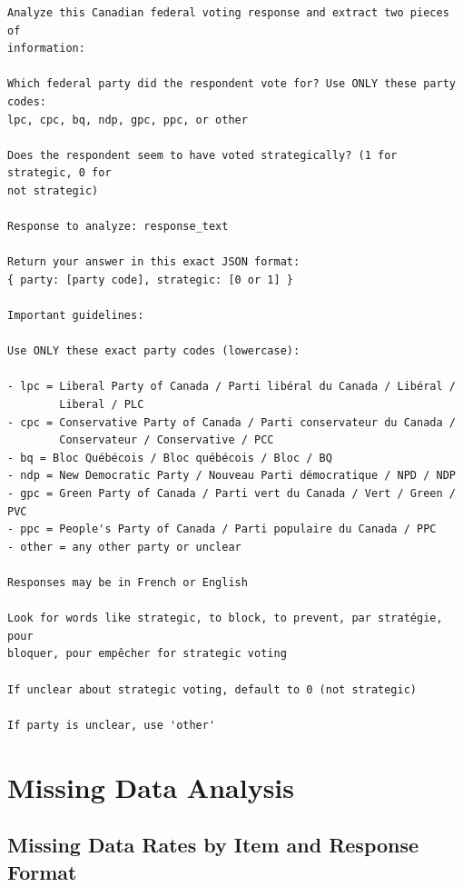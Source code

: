 {\small
\begin{verbatim}
Analyze this Canadian federal voting response and extract two pieces of 
information:

Which federal party did the respondent vote for? Use ONLY these party codes: 
lpc, cpc, bq, ndp, gpc, ppc, or other

Does the respondent seem to have voted strategically? (1 for strategic, 0 for 
not strategic)

Response to analyze: response_text

Return your answer in this exact JSON format: 
{ party: [party code], strategic: [0 or 1] }

Important guidelines:

Use ONLY these exact party codes (lowercase):

- lpc = Liberal Party of Canada / Parti libéral du Canada / Libéral / 
        Liberal / PLC
- cpc = Conservative Party of Canada / Parti conservateur du Canada / 
        Conservateur / Conservative / PCC
- bq = Bloc Québécois / Bloc québécois / Bloc / BQ
- ndp = New Democratic Party / Nouveau Parti démocratique / NPD / NDP
- gpc = Green Party of Canada / Parti vert du Canada / Vert / Green / PVC
- ppc = People's Party of Canada / Parti populaire du Canada / PPC
- other = any other party or unclear

Responses may be in French or English

Look for words like strategic, to block, to prevent, par stratégie, pour 
bloquer, pour empêcher for strategic voting

If unclear about strategic voting, default to 0 (not strategic)

If party is unclear, use 'other'
\end{verbatim}
}

\clearpage

\section{Missing Data Analysis}
\label{appendix-missing-data}

\subsection{Missing Data Rates by Item and Response Format}


